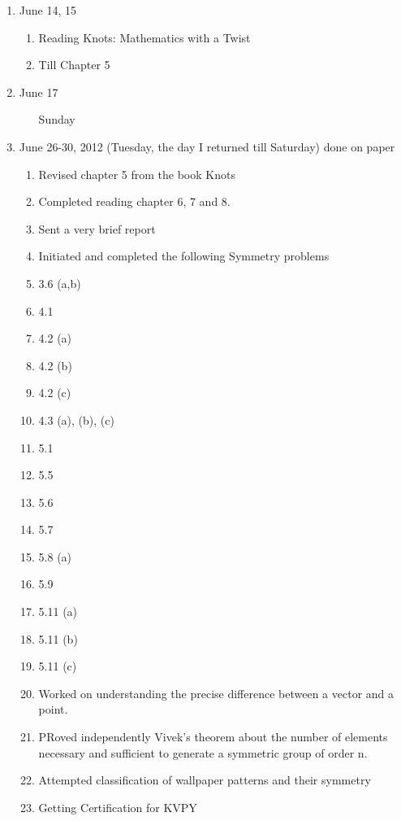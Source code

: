 \begin{enumerate}
		\item June 14, 15
		\begin{enumerate}
		\item Reading Knots: Mathematics with a Twist
		\item Till Chapter 5
		\end{enumerate}
		
		\item June 17
		\begin{enumerate}
		\item [Sunday]
		\end{enumerate}
		
		\item June 26-30, 2012 (Tuesday, the day I returned till Saturday) {done on paper}
		\begin{enumerate}
		\item Revised chapter 5 from the book Knots
		\item Completed reading chapter 6, 7 and 8.
		\item Sent a very brief report
		\item Initiated and completed the following Symmetry problems
		\item 3.6 (a,b)
		\item 4.1
		\item 4.2 (a)
		\item 4.2 (b)
		\item 4.2 (c)
		\item 4.3 (a), (b), (c)
		\item 5.1
		\item 5.5
		\item 5.6 
		\item 5.7 
		\item 5.8 (a)
		\item 5.9
		\item 5.11 (a)
		\item 5.11 (b)
		\item 5.11 (c)
		\item Worked on understanding the precise difference between a vector and a point.
		\item PRoved independently Vivek's theorem about the number of elements necessary and sufficient to generate a symmetric group of order n.
		\item Attempted classification of wallpaper patterns and their symmetry
		\item Getting Certification for KVPY
		\end{enumerate}
		

\end{enumerate}

